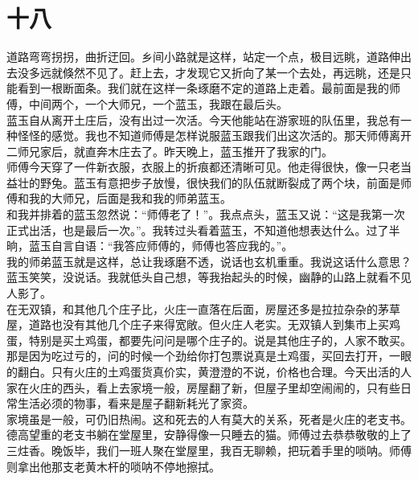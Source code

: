 \fancyhead[RO]{\thepage} %
\fancyhead[LE]{\thepage} %
\fancyfoot[LE,RO]{}
\fancyfoot[LO,CE]{}
\fancyfoot[CO,RE]{}
\chapter*{十八}
道路弯弯拐拐，曲折迂回。乡间小路就是这样，站定一个点，极目远眺，道路伸出去没多远就倏然不见了。赶上去，才发现它又折向了某一个去处，再远眺，还是只能看到一根断面条。我们就在这样一条琢磨不定的道路上走着。最前面是我的师傅，中间两个，一个大师兄，一个蓝玉，我跟在最后头。\\

蓝玉自从离开土庄后，没有出过一次活。今天他能站在游家班的队伍里，我总有一种怪怪的感觉。我也不知道师傅是怎样说服蓝玉跟我们出这次活的。那天师傅离开二师兄家后，就直奔木庄去了。昨天晚上，蓝玉推开了我家的门。\\

师傅今天穿了一件新衣服，衣服上的折痕都还清晰可见。他走得很快，像一只老当益壮的野兔。蓝玉有意把步子放慢，很快我们的队伍就断裂成了两个块，前面是师傅和我的大师兄，后面是我和我的师弟蓝玉。\\

和我并排着的蓝玉忽然说：“师傅老了！”。我点点头，蓝玉又说：“这是我第一次正式出活，也是最后一次。”。我转过头看着蓝玉，不知道他想表达什么。过了半晌，蓝玉自言自语：“我答应师傅的，师傅也答应我的。”。\\

我的师弟蓝玉就是这样，总让我琢磨不透，说话也玄机重重。我说这话什么意思？蓝玉笑笑，没说话。我就低头自己想，等我抬起头的时候，幽静的山路上就看不见人影了。\\

在无双镇，和其他几个庄子比，火庄一直落在后面，房屋还多是拉拉杂杂的茅草屋，道路也没有其他几个庄子来得宽敞。但火庄人老实。无双镇人到集市上买鸡蛋，特别是买土鸡蛋，都要先问问是哪个庄子的。说是其他庄子的，人家不敢买。那是因为吃过亏的，问的时候一个劲给你打包票说真是土鸡蛋，买回去打开，一眼的翻白。只有火庄的土鸡蛋货真价实，黄澄澄的不说，价格也合理。今天出活的人家在火庄的西头，看上去家境一般，房屋翻了新，但屋子里却空闹闹的，只有些日常生活必须的物事，看来是屋子翻新耗光了家资。\\

家境虽是一般，可仍旧热闹。这和死去的人有莫大的关系，死者是火庄的老支书。德高望重的老支书躺在堂屋里，安静得像一只睡去的猫。师傅过去恭恭敬敬的上了三炷香。晚饭毕，我们一班人聚在堂屋里，我百无聊赖，把玩着手里的唢呐。师傅则拿出他那支老黄木杆的唢呐不停地擦拭。\\

